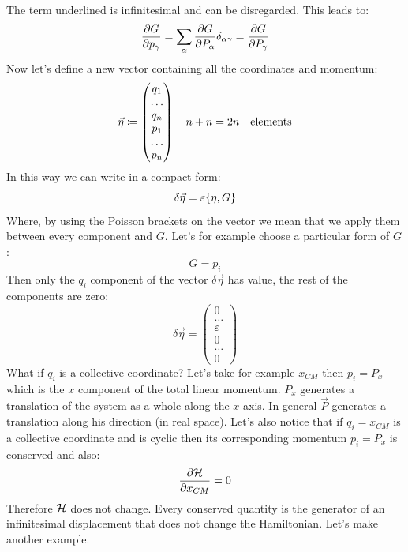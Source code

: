 The term underlined is infinitesimal and can be disregarded. This leads to:
\begin{equation}
    \pdv{G}{p_{\gamma}} = \bigsum_{\alpha} \pdv{G}{P_{\alpha}}\delta_{\alpha \gamma} = \pdv{G}{P_{\gamma}}
\end{equation}
Now let's define a new vector containing all the coordinates and momentum:
\begin{equation}
    \vec{\eta} \coloneqq \begin{pmatrix}
        q_1\\\dots\\q_n\\p_1\\\dots\\p_n
    \end{pmatrix}
    \quad n+n = 2n \quad \text{elements}
\end{equation}
In this way we can write in a compact form:
\begin{equation}
    \delta \vec{\eta} = \varepsilon \pb{\eta}{G}
\end{equation}
Where, by using the Poisson brackets on the vector we mean that we apply them between every component and $G$. Let's for example choose a particular form of $G$:
\begin{equation}
    G = p_i
\end{equation}
Then only the $q_i$ component of the vector $\delta \vec{\eta}$ has value, the rest of the components are zero:
\begin{equation}
    \delta \vec{\eta} = \begin{pmatrix}
        0\\\dots\\\varepsilon\\0\\\dots\\0
    \end{pmatrix}
\end{equation}
What if $q_i$ is a collective coordinate? Let's take for example $x_{CM}$ then $p_i = P_x$ which is the $x$ component of the total linear momentum. $P_x$ generates a translation of the system as a whole along the $x$ axis. In general $\vec{P}$ generates a translation along his direction (in real space). Let's also notice that if $q_i = x_{CM}$ is a collective coordinate and is cyclic then its corresponding momentum $p_i = P_x$ is conserved and also:
\begin{equation}
  \pdv{\hamfun}{x_{CM}}=0
\end{equation}
Therefore $\mathcal{H}$ does not change. Every conserved quantity is the generator of an infinitesimal displacement that does not change the Hamiltonian. Let's make another example.\\

